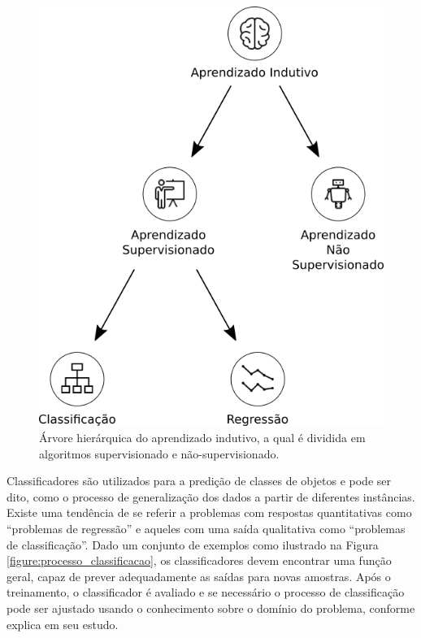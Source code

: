 \begin{figure}[H]
\begin{center}
    \includegraphics[scale=0.40]{images/aprendizado_indutivo.png}
\end{center}
\caption{Árvore hierárquica do aprendizado indutivo, a qual é dividida em 
algoritmos supervisionado e não-supervisionado.}
\label{figure:aprendizado_indutivo}
\end{figure}

Classificadores são utilizados para a predição de classes de objetos e pode ser 
dito, como o processo de generalização dos dados a partir de diferentes 
instâncias. Existe uma tendência de se referir a problemas com respostas 
quantitativas como ``problemas de regressão'' e aqueles com uma saída 
qualitativa como ``problemas de classificação''. Dado um conjunto de exemplos 
como ilustrado na Figura \ref{figure:processo_classificacao}, os 
classificadores devem encontrar uma função geral, capaz de prever adequadamente 
as saídas para novas amostras. Após o treinamento, o classificador é avaliado e 
se necessário o processo de classificação pode ser ajustado usando o 
conhecimento sobre o domínio do problema, conforme 
 explica em seu estudo.

